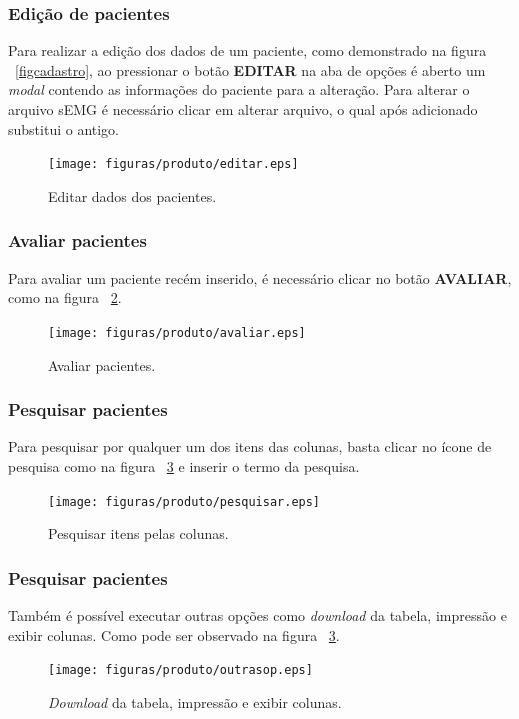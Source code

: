 \subsubsection{Edição de pacientes}
Para realizar a edição dos dados de um paciente, como demonstrado na figura ~\ref{figcadastro}, ao pressionar o botão \textbf{EDITAR} na aba de opções é aberto um \textit{modal} contendo as informações do paciente para a alteração. Para alterar o arquivo sEMG é necessário clicar em alterar arquivo, o qual após adicionado substitui o antigo.

\begin{figure}[!htb]
    \centering
    \texttt{[image: figuras/produto/editar.eps]}
    \caption{Editar dados dos pacientes.}
    \label{figeditar}
\end{figure}

\subsubsection{Avaliar pacientes}
Para avaliar um paciente recém inserido, é necessário clicar no botão \textbf{AVALIAR}, como na figura ~\ref{figavaliar}.
\begin{figure}[!htb]
    \centering
    \texttt{[image: figuras/produto/avaliar.eps]}
    \caption{Avaliar pacientes.}
    \label{figavaliar}
\end{figure}

\subsubsection{Pesquisar pacientes}
Para pesquisar por qualquer um dos itens das colunas, basta clicar no ícone de pesquisa como na figura ~\ref{figpesquisar} e inserir o termo da pesquisa.
\begin{figure}[!htb]
    \centering
    \texttt{[image: figuras/produto/pesquisar.eps]}
    \caption{Pesquisar itens pelas colunas.}
    \label{figpesquisar}
\end{figure}

\subsubsection{Pesquisar pacientes}
Também é possível executar outras opções como \textit{download} da tabela, impressão e exibir colunas. Como pode ser observado na figura ~\ref{figpesquisar}.
\begin{figure}[!htb]
    \centering
    \texttt{[image: figuras/produto/outrasop.eps]}
    \caption{\textit{Download} da tabela, impressão e exibir colunas.}
    \label{figoutrasop}
\end{figure}

